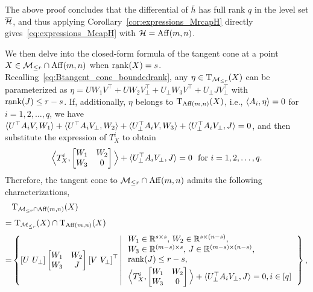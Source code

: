 The above proof concludes that the differential of $\bar{h}$ has full rank $q$ in the level set $\overline{\mathcal{H}}$, and thus applying Corollary~\ref{cor:expressions_MrcapH} directly gives~\eqref{eq:expressions_McapH} with $\mathcal{H}=\mathrm{Aff}(m,n)$. 


We then delve into the closed-form formula of the tangent cone at a point $X\in\mathcal{M}_{\le r}\cap\mathrm{Aff}(m,n)$ when $\operatorname{rank}(X)=s$. Recalling~\eqref{eq:Btangent_cone_boundedrank}, any $\eta\in\mathrm{T}_{\mathcal{M}_{\le r}}(X)$ can be parameterized as $\eta=UW_1V^\top + UW_2V^\top_\bot + U_\bot W_3V^\top + U_\bot JV^\top_\bot$ with $\operatorname{rank}(J)\le r-s$. If, additionally, $\eta$ belongs to $\mathrm{T}_{\mathrm{Aff}(m,n)}(X)$, i.e., $\langle {A_i,\eta} \rangle=0$ for $i=1,2,\ldots,q$, we have $\langle {U^\top A_i V, W_1} \rangle + \langle {U^\top A_iV_\bot,W_2} \rangle + \langle {U_\bot^\top A_i V,W_3} \rangle + \langle {U_\bot^\top A_iV_\bot,J} \rangle=0$, and then substitute the expression of $T^i_X$ to obtain
\begin{equation*}
\Big\langle T^i_X, \left[ \begin{matrix}
W_1 &		W_2\\
W_3 &		0\\
\end{matrix} \right] \Big\rangle +\innerp{U_\bot^\top A_iV_\bot,J} =0\ \ \text{for}\ i=1,2,\ldots,q.
\end{equation*}
Therefore, the tangent cone to $\mathcal{M}_{\le r}\cap\mathrm{Aff}(m,n)$ admits the following characterizations,
\begin{align}
&\Btangent_{\boundedrank\cap\affine(m,n)}(X) \nonumber
\\[1mm]
=&\ \Btangent_{\boundedrank}(X)\cap\Btangent_{\affine(m,n)}(X)   \nonumber
\\[1mm]
=&\hkh{\left[ U\,\,U_{\bot} \right] \left[ \begin{matrix}
W_1 &	W_2\\
W_3 &   J\\
\end{matrix} \right] \left[ V\,\,V_{\bot} \right] ^{\top}\left|\,\begin{array}{l}
W_1\in\mbR^{s\times s},\, W_2\in\mathbb{R} ^{s\times \left( n-s \right)},
\\
W_3\in\mathbb{R} ^{\left( m-s \right) \times s},\, J\in \mbR^{\left( m-s \right) \times \left( n-s \right)},
\\
\rank(J)\le r-s,
\\[1mm]
\Big\langle T^i_X, \left[ \begin{matrix}
    W_1 &		W_2\\
    W_3 &		0\\
\end{matrix} \right] \Big\rangle +\innerp{U_\bot^\top A_iV_\bot,J} =0, i\in [q] \label{eq:tangent_MHaffine}
\end{array}
\right.},    
\end{align}

